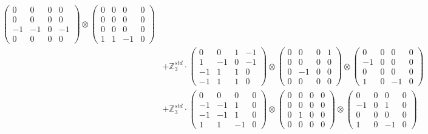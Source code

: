 \documentclass{article}
\begin{document}
{\begin{align}
            \begin{pmatrix} 0 & 0 & 0 & 0 \\ 0 & 0 & 0 & 0 \\ -1 & -1 & 0 & -1 \\ 0 & 0 & 0 & 0 \end{pmatrix} \otimes 
            \begin{pmatrix} 0 & 0 & 0 & 0 \\ 0 & 0 & 0 & 0 \\ 0 & 0 & 0 & 0 \\ 1 & 1 & -1 & 0 \end{pmatrix} \\ 
        &+ \label{Rs16-Rc11-Solution-22-c20} \mathbb{Z}_3^{std} \cdot 
            \begin{pmatrix} 0 & 0 & 1 & -1 \\ 1 & -1 & 0 & -1 \\ -1 & 1 & 1 & 0 \\ -1 & 1 & 1 & 0 \end{pmatrix} \otimes 
            \begin{pmatrix} 0 & 0 & 0 & 1 \\ 0 & 0 & 0 & 0 \\ 0 & -1 & 0 & 0 \\ 0 & 0 & 0 & 0 \end{pmatrix} \otimes 
            \begin{pmatrix} 0 & 0 & 0 & 0 \\ -1 & 0 & 0 & 0 \\ 0 & 0 & 0 & 0 \\ 1 & 0 & -1 & 0 \end{pmatrix} \\ 
        &+ \label{Rs16-Rc11-Solution-22-c21} \mathbb{Z}_3^{std} \cdot 
            \begin{pmatrix} 0 & 0 & 0 & 0 \\ -1 & -1 & 1 & 0 \\ -1 & -1 & 1 & 0 \\ 1 & 1 & -1 & 0 \end{pmatrix} \otimes 
            \begin{pmatrix} 0 & 0 & 0 & 0 \\ 0 & 0 & 0 & 0 \\ 0 & 1 & 0 & 0 \\ 0 & 0 & 0 & 0 \end{pmatrix} \otimes 
            \begin{pmatrix} 0 & 0 & 0 & 0 \\ -1 & 0 & 1 & 0 \\ 0 & 0 & 0 & 0 \\ 1 & 0 & -1 & 0 \end{pmatrix} \\ 

\end{align}}
\end{document}
